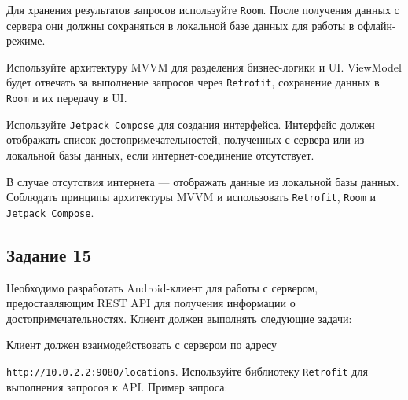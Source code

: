 \documentclass[a4paper,12pt]{article}
\begin{document}
Для хранения результатов запросов используйте \texttt{Room}. После получения данных с сервера они должны сохраняться в локальной базе данных для работы в офлайн-режиме.


Используйте архитектуру MVVM для разделения бизнес-логики и UI. ViewModel будет отвечать за выполнение запросов через \texttt{Retrofit}, сохранение данных в \texttt{Room} и их передачу в UI.


Используйте \texttt{Jetpack Compose} для создания интерфейса. Интерфейс должен отображать список достопримечательностей, полученных с сервера или из локальной базы данных, если интернет-соединение отсутствует.


В случае отсутствия интернета — отображать данные из локальной базы данных.
Соблюдать принципы архитектуры MVVM и использовать \texttt{Retrofit}, \texttt{Room} и \texttt{Jetpack Compose}.
\subsection*{Задание 15}

Необходимо разработать Android-клиент для работы с сервером, предоставляющим REST API для получения информации о достопримечательностях. Клиент должен выполнять следующие задачи:

Клиент должен взаимодействовать с сервером по адресу 

\texttt{http://10.0.2.2:9080/locations}. Используйте библиотеку \texttt{Retrofit} для выполнения запросов к API. Пример запроса:
\end{document}
